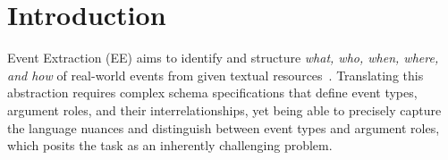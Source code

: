 \section{Introduction}


Event Extraction (EE) aims to identify and structure \textit{what, who, when, where, and how} of real-world events from given textual resources~\cite{doddington-etal-2004-automatic, ji-grishman-2008-refining, li2022survey, xu2024large}. 
Translating this abstraction requires complex schema specifications that define event types, argument roles, and their interrelationships, yet being able to precisely capture the language nuances and distinguish between event types and argument roles, which posits the task as an inherently challenging problem.




